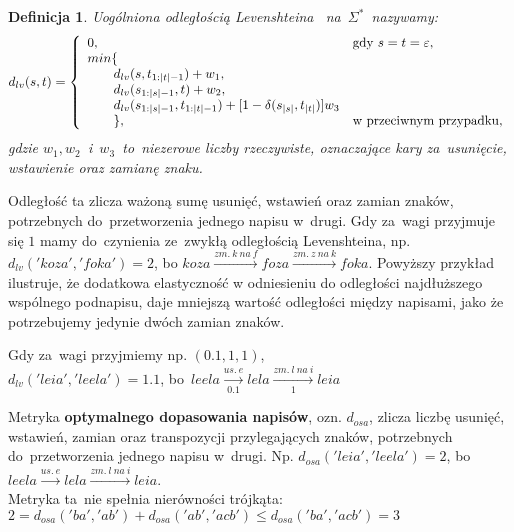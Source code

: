 \documentclass[12pt, twoside, openany]{report}
\theoremstyle{plain}
\newtheorem{defi}{Definicja}[section]
\begin{document}
\begin{defi}
Uogólniona \emph{odległością Levenshteina} \cite{Levenshtein1965:binarycodes}~na~$\Sigma^*$~nazywamy:
$$
d_{lv}(s, t) = \left\{
\begin{array}{l l}     
    0, & \text{gdy } s = t = \varepsilon,\\
    min\{ & \\
\qquad    d_{lv}(s, t_{1:|t|-1}) + w_1, & \\
\qquad    d_{lv}(s_{1:|s|-1}, t) + w_2, & \\
\qquad    d_{lv}(s_{1:|s|-1}, t_{1:|t|-1}) + [1-\delta(s_{|s|}, t_{|t|})]w_3 & \\
\qquad    \}, & \text{w przeciwnym przypadku},
\end{array}\right.
$$
gdzie $w_1, w_2$~i~$w_3$~to~niezerowe liczby rzeczywiste, oznaczające kary za~usunięcie, wstawienie oraz zamianę znaku.
\end{defi}

Odległość ta zlicza ważoną sumę usunięć, wstawień oraz zamian znaków, potrzebnych do~przetworzenia jednego napisu w~drugi. Gdy za~wagi przyjmuje się $1$ mamy do~czynienia ze~zwykłą odległością Levenshteina, np.~$d_{lv}('koza', 'foka') = 2$, bo $koza  \xrightarrow{zm.\ k\ na\ f} foza  \xrightarrow{zm.\ z\ na\ k} foka$. Powyższy przykład ilustruje, że dodatkowa elastyczność w odniesieniu do odległości najdłuższego wspólnego podnapisu, daje mniejszą wartość odległości między napisami, jako że potrzebujemy jedynie dwóch zamian znaków.

Gdy za~wagi przyjmiemy np. $(0.1, 1, 1)$, \\
$d_{lv}('leia', 'leela') = 1.1$, bo~$leela  \xrightarrow[0.1]{us.\ e} lela  \xrightarrow[1]{zm.\ l\ na\ i} leia$ 


Metryka \textbf{optymalnego dopasowania napisów}, ozn. $d_{osa}$, zlicza liczbę usunięć, wstawień, zamian oraz transpozycji przylegających znaków, potrzebnych do~przetworzenia jednego napisu w~drugi. Np. $d_{osa}('leia', 'leela') = 2$, bo $leela  \xrightarrow{us.\ e} lela  \xrightarrow{zm.\ l\ na\ i} leia$. \\

Metryka ta~nie spełnia nierówności trójkąta: $2 = d_{osa}('ba', 'ab') + d_{osa}('ab', 'acb') \leq d_{osa}('ba', 'acb') = 3$\\


\end{document}

